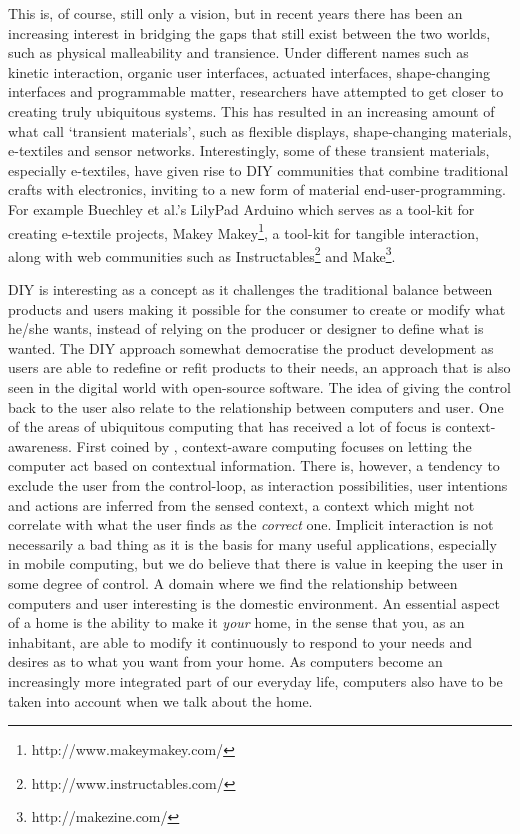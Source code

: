 This is, of course, still only a vision, but in recent years there has been an increasing interest in bridging the gaps that still exist between the two worlds, such as physical malleability and transience.
Under different names such as kinetic interaction, organic user interfaces, actuated interfaces, shape-changing interfaces and programmable matter, researchers have attempted to get closer to creating truly ubiquitous systems.    
This has resulted in an increasing amount of what \citet{coelho2009programming} call `transient materials', such as flexible displays, shape-changing materials, e-textiles and sensor networks.
\blank
Interestingly, some of these transient materials, especially e-textiles, have given rise to DIY communities that combine traditional crafts with electronics, inviting to a new form of material end-user-programming.
For example Buechley et al.'s LilyPad Arduino which serves as a tool-kit for creating e-textile projects, Makey Makey\footnote{http://www.makeymakey.com/}, a tool-kit for tangible interaction, along with web communities such as Instructables\footnote{http://www.instructables.com/} and Make\footnote{http://makezine.com/}.

DIY is interesting as a concept as it challenges the traditional balance between products and users making it possible for the consumer to create  or modify what he/she wants, instead of relying on the producer or designer to define what is wanted.
The DIY approach somewhat democratise the product development as users are able to redefine or refit products to their needs, an approach that is also seen in the digital world with open-source software.
\blank
The idea of giving the control back to the user also relate to the relationship between computers and user.
One of the areas of ubiquitous computing that has received a lot of focus is context-awareness.
First coined by \citet{schilit1994context}, context-aware computing focuses on letting the computer act based on contextual information.
There is, however, a tendency to exclude the user from the control-loop, as interaction possibilities, user intentions and actions are inferred from the sensed context, a context which might not correlate with what the user finds as the \emph{correct} one.
Implicit interaction is not necessarily a bad thing as it is the basis for many useful applications, especially in mobile computing, but we do believe that there is value in keeping the user in some degree of control.
\blank
A domain where we find the relationship between computers and user interesting is the domestic environment.
An essential aspect of a home is the ability to make it \emph{your} home, in the sense that you, as an inhabitant, are able to modify it continuously to respond to your needs and desires as to what you want from your home.
As computers become an increasingly more integrated part of our everyday life, computers also have to be taken into account when we talk about the home.

